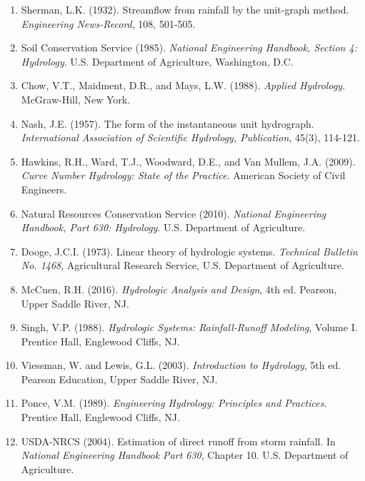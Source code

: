 \documentclass[a4paper, 11pt]{article}
\begin{document}
\begin{enumerate}
\item Sherman, L.K. (1932). Streamflow from rainfall by the unit-graph method.
\textit{Engineering News-Record}, 108, 501-505.

\item Soil Conservation Service (1985). \textit{National Engineering Handbook, Section 4: Hydrology}.
U.S. Department of Agriculture, Washington, D.C.

\item Chow, V.T., Maidment, D.R., and Mays, L.W. (1988). \textit{Applied Hydrology}.
McGraw-Hill, New York.

\item Nash, J.E. (1957). The form of the instantaneous unit hydrograph.
\textit{International Association of Scientific Hydrology, Publication}, 45(3), 114-121.

\item Hawkins, R.H., Ward, T.J., Woodward, D.E., and Van Mullem, J.A. (2009).
\textit{Curve Number Hydrology: State of the Practice}. American Society of Civil Engineers.

\item Natural Resources Conservation Service (2010). \textit{National Engineering Handbook,
Part 630: Hydrology}. U.S. Department of Agriculture.

\item Dooge, J.C.I. (1973). Linear theory of hydrologic systems. \textit{Technical Bulletin
No. 1468}, Agricultural Research Service, U.S. Department of Agriculture.

\item McCuen, R.H. (2016). \textit{Hydrologic Analysis and Design}, 4th ed. Pearson, Upper Saddle River, NJ.

\item Singh, V.P. (1988). \textit{Hydrologic Systems: Rainfall-Runoff Modeling}, Volume I.
Prentice Hall, Englewood Cliffs, NJ.

\item Viessman, W. and Lewis, G.L. (2003). \textit{Introduction to Hydrology}, 5th ed.
Pearson Education, Upper Saddle River, NJ.

\item Ponce, V.M. (1989). \textit{Engineering Hydrology: Principles and Practices}.
Prentice Hall, Englewood Cliffs, NJ.

\item USDA-NRCS (2004). Estimation of direct runoff from storm rainfall. In \textit{National
Engineering Handbook Part 630}, Chapter 10. U.S. Department of Agriculture.


\end{enumerate}
\end{document}
